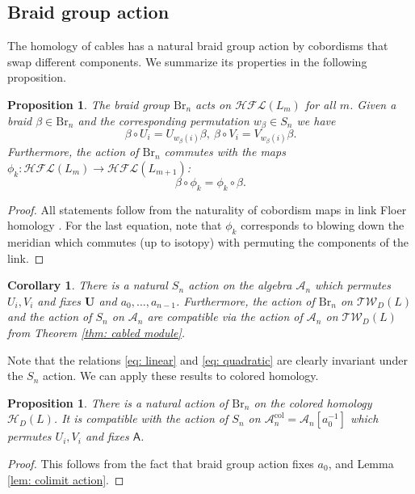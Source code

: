 \documentclass{amsart}
\newtheorem{corollary}[theorem]{Corollary}
\newtheorem{proposition}[theorem]{Proposition}
\newcommand{\CA}{\mathcal{A}}
\newcommand{\col}{\mathrm{col}}
\newcommand{\Tw}{\mathcal{TW}}
\newcommand{\cHFL}{\mathcal{H\!F\! L}}
\newcommand{\HD}{\mathcal{H}}
\newcommand{\UU}{\mathbf{U}}
\newcommand{\Br}{\mathrm{Br}}
\newcommand{\AAA}{\mathsf{A}}
\begin{document}
\subsection{Braid group action}

The homology of cables has a natural braid group action by cobordisms that swap different components. We summarize its properties in the following proposition. 

\begin{proposition}
The braid group $\Br_n$ acts on $\cHFL(L_{m})$ for all $m$. Given a braid $\beta\in \Br_n$ and the corresponding permutation $w_{\beta}\in S_n$ we have
$$
\beta\circ U_i=U_{w_{\beta}(i)}\beta,\ \beta\circ V_i=V_{w_{\beta}(i)}\beta.
$$
Furthermore, the action of $\Br_n$ commutes with the maps $\phi_k:\cHFL(L_{m})\to \cHFL(L_{m+1})$:
$$
\beta\circ \phi_k=\phi_k\circ \beta.
$$
\end{proposition}

\begin{proof}
All statements follow from the naturality of cobordism maps in link Floer homology \cite{Zemke}. For the last equation, note that $\phi_k$ corresponds to blowing down the meridian which commutes (up to isotopy) with permuting the components of the link.

\end{proof}

\begin{corollary}
There is a natural $S_n$ action on the algebra $\CA_n$ which permutes $U_i,V_i$ and fixes $\UU$ and $a_0,\ldots,a_{n-1}$.  Furthermore, the action of $\Br_n$ on $\Tw_D(L)$ and the action of $S_n$ on $\CA_n$ are compatible via the action of $\CA_n$ on $\Tw_D(L)$ from Theorem \ref{thm: cabled module}.
\end{corollary}

Note that the relations \eqref{eq: linear} and \eqref{eq: quadratic} are clearly invariant under the $S_n$ action. We can apply these results to colored homology.

\begin{proposition}
There is a natural action of $\Br_n$ on the colored homology $\HD_{D}(L)$. It is compatible with the action of $S_n$ on $\CA_n^{\col}=\CA_n[a_0^{-1}]$ which permutes $U_i,V_i$ and fixes $\AAA$.
\end{proposition}

\begin{proof}
This follows from the fact that braid group action fixes $a_0$, and Lemma \ref{lem: colimit action}.
\end{proof}
\end{document}

